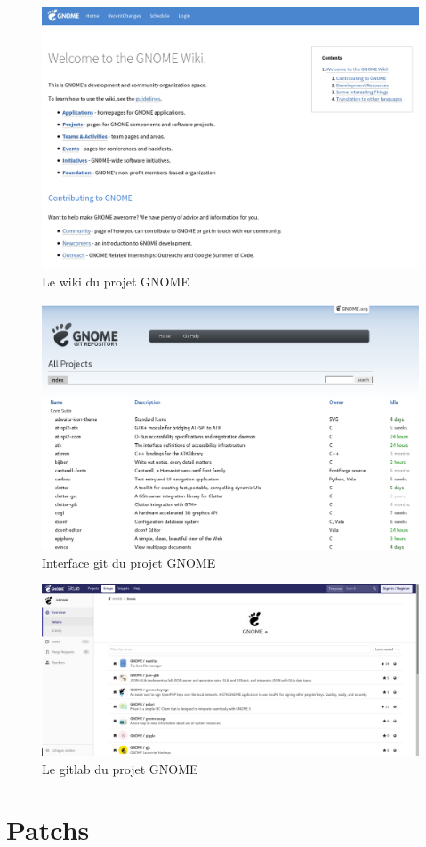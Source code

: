 \documentclass[12pt]{report}
\begin{document}
\begin{figure}[p]
  \caption{\label{figure_wiki} Le wiki du projet GNOME}
  \includegraphics[width=15cm]{images/wiki_gnome_org.png}
\end{figure}

\begin{figure}[p]
  \caption{\label{figure_cgit} Interface git du projet GNOME}
  \includegraphics[width=15cm]{images/git_gnome_org.png}
\end{figure}

\begin{figure}[p]
  \caption{\label{figure_gitlab} Le gitlab du projet GNOME}
  \includegraphics[width=15cm]{images/gitlab_gnome_org.png}
\end{figure}

\chapter{Patchs} 
\end{document}
